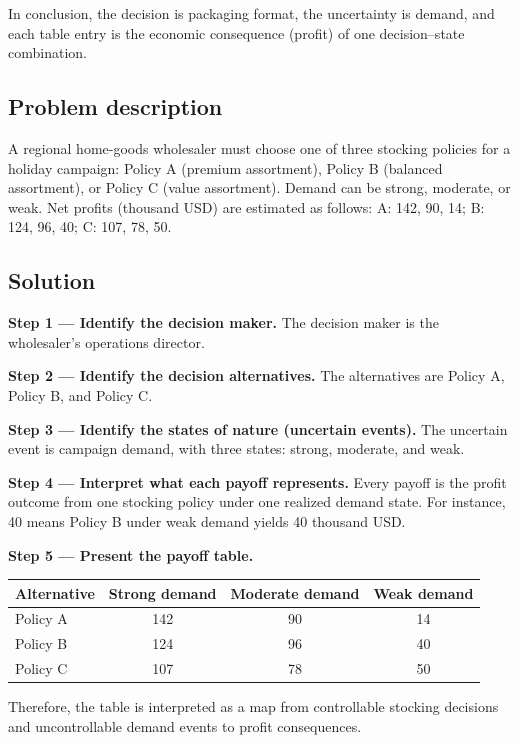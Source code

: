 \begin{ExamProblems}
		In conclusion, the decision is packaging format, the uncertainty is demand, and each table entry is the economic consequence (profit) of one decision--state combination.
		
		\item
		\subsection*{Problem description}
		A regional home-goods wholesaler must choose one of three stocking policies for a holiday campaign:
		Policy A (premium assortment), Policy B (balanced assortment), or Policy C (value assortment).
		Demand can be strong, moderate, or weak.
		Net profits (thousand USD) are estimated as follows:
		A: 142, 90, 14; B: 124, 96, 40; C: 107, 78, 50.
		
		\subsection*{Solution}
		\textbf{Step 1 --- Identify the decision maker.} The decision maker is the wholesaler's operations director.
		
		\textbf{Step 2 --- Identify the decision alternatives.} The alternatives are Policy A, Policy B, and Policy C.
		
		\textbf{Step 3 --- Identify the states of nature (uncertain events).} The uncertain event is campaign demand, with three states: strong, moderate, and weak.
		
		\textbf{Step 4 --- Interpret what each payoff represents.} Every payoff is the profit outcome from one stocking policy under one realized demand state. For instance, 40 means Policy B under weak demand yields 40 thousand USD.
		
		\textbf{Step 5 --- Present the payoff table.}
		\begin{center}
			\begin{tabular}{l c c c}
				\toprule
				Alternative & Strong demand & Moderate demand & Weak demand \\
				\midrule
				Policy A & 142 & 90 & 14 \\
				Policy B & 124 & 96 & 40 \\
				Policy C & 107 & 78 & 50 \\
				\bottomrule
			\end{tabular}
		\end{center}
		
		Therefore, the table is interpreted as a map from controllable stocking decisions and uncontrollable demand events to profit consequences.
		

\end{ExamProblems}
